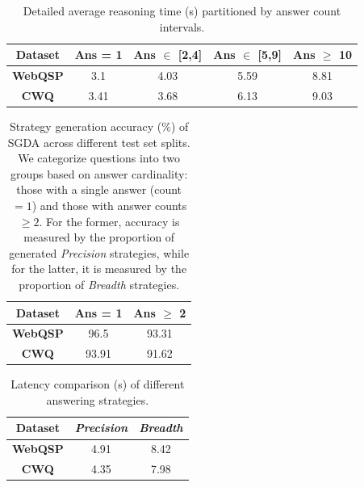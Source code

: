 \documentclass[11pt]{article}
\begin{document}
\begin{table}[t]
\centering
\footnotesize
\renewcommand{\arraystretch}{1.15} %
\setlength{\tabcolsep}{2.5pt} 

\begin{tabular}{c|cccc}
\hline
{\textbf{Dataset}} & {\textbf{Ans} = 1} & {\textbf{Ans} $\in$ [2,4]} & {\textbf{Ans} $\in$ [5,9]} & {\textbf{Ans} $\geq$ 10} \\

\hline
\textbf{WebQSP}    &  3.1 & 4.03 & 5.59 & 8.81 \\
\textbf{CWQ}  & 3.41 & 3.68 & 6.13 & 9.03 \\
\hline
\end{tabular}
\caption{Detailed average reasoning time (s) partitioned by answer count intervals.}
\label{tab:per_speed_ans_count}
\end{table}

\begin{table}[t]
\centering
\footnotesize
\renewcommand{\arraystretch}{1.15} %
\setlength{\tabcolsep}{2.5pt} 

\begin{tabular}{c|cc}
\hline
{\textbf{Dataset}} & {\textbf{Ans} = 1} & {\textbf{Ans} $\geq$ 2} \\

\hline
\textbf{WebQSP}    &  96.5 & 93.31 \\
\textbf{CWQ}  & 93.91 & 91.62 \\
\hline
\end{tabular}
\caption{Strategy generation accuracy (\%) of SGDA across different test set splits. We categorize questions into two groups based on answer cardinality: those with a single answer (count $= 1$) and those with answer counts $\geq 2$. For the former, accuracy is measured by the proportion of generated \textit{Precision} strategies, while for the latter, it is measured by the proportion of \textit{Breadth} strategies. }
\label{tab:sgda_acc}
\end{table}

\begin{table}[t]
\centering
\renewcommand{\arraystretch}{1.15} %
\setlength{\tabcolsep}{12pt} %

\begin{tabular}{c|cc} %
\hline
\textbf{Dataset} & \textit{Precision} & \textit{Breadth} \\
\hline
\textbf{WebQSP} & 4.91 & 8.42 \\
\textbf{CWQ}    & 4.35 & 7.98 \\
\hline
\end{tabular}
\caption{Latency comparison (s) of different answering strategies.}
\label{tab:pre_brd}
\end{table}
\end{document}
